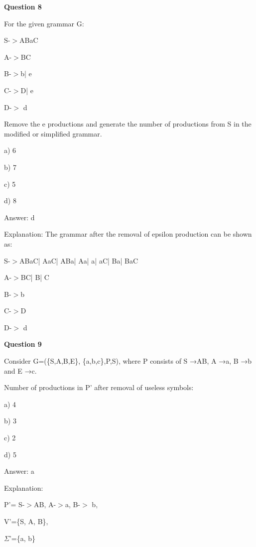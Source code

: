 \documentclass{article}
\begin{document}
\begin{mdframed}[linewidth=1pt, roundcorner=5pt, linecolor=gray!30, backgroundcolor=gray!5]
\textbf{Question 8} 

For the given grammar G:

S-$>$ABaC

A-$>$BC

B-$>$b| e

C-$>$D| e

D-$>$ d

Remove the e productions and generate the number of productions from S in the modified or simplified grammar.

a) 6

b) 7

c) 5

d) 8
\vspace{5pt} \par
\begin{tcolorbox}[colback=green!5, colframe=green!40!black, title=Solution]
Answer: d

Explanation: The grammar after the removal of epsilon production can be shown as:

S-$>$ABaC| AaC| ABa| Aa| a| aC| Ba| BaC

A-$>$BC| B| C

B-$>$b

C-$>$D

D-$>$ d
\end{tcolorbox}
\end{mdframed}
\newpage

\begin{mdframed}[linewidth=1pt, roundcorner=5pt, linecolor=gray!30, backgroundcolor=gray!5]
\textbf{Question 9} 

Consider G=(\{S,A,B,E\}, \{a,b,c\},P,S), where P consists of S →AB, A →a, B →b and E →c.

Number of productions in P' after removal of useless symbols:

a) 4

b) 3

c) 2

d) 5
\vspace{5pt} \par
\begin{tcolorbox}[colback=green!5, colframe=green!40!black, title=Solution]
Answer: a

Explanation:

P'= S-$>$AB, A-$>$a, B-$>$ b,

V'=\{S, A, B\},

$\Sigma$'=\{a, b\}
\end{tcolorbox}
\end{mdframed}
\end{document}
